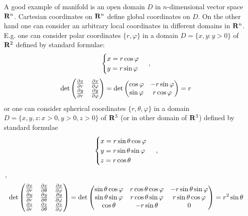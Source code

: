 \documentclass[12pt]{article}
\theoremstyle{theorem}
\numberwithin{equation}{section}
\begin{document}
    A good example of manifold is an open domain  $D$ in  
$n$-dimensional vector space ${\bf R}^n$.
    Cartesian coordinates on ${\bf R}^n$ define global coordinates on $D$.
    On the other hand one can consider an arbitrary 
local coordinates in different domains in ${\bf R}^n$. E.g. 
one can consider polar coordinates $\{r,\varphi\}$ 
in a domain $D=\{x,y\colon y>0\}$ of ${\bf R}^2$
    defined by standard formulae:
              \begin{equation}\label{exampleofpolarcoordinates}
                \begin{cases}
                x=r\cos\varphi\cr y=r\sin\varphi\cr
                \end{cases}\,,
              \end{equation}
            \begin{equation}\label{jacobianofpolartransform}
                \det
          \begin{pmatrix}
          {\partial x\over \partial r} &{\partial x\over \partial \varphi}\cr
          {\partial y\over \partial r} &{\partial y\over \partial \varphi}\cr
          \end{pmatrix}=
                \det
          \begin{pmatrix}
          \cos\varphi &-r\sin\varphi\cr
          \sin\varphi &r\cos\varphi\cr
          \end{pmatrix}=r
            \end{equation}
             or one can consider spherical 
coordinates  $\{r,\theta,\varphi\}$ in a domain
  $D=\{x,y,z\colon x>0,y>0, z>0\}$ of ${\bf R}^3$ (or in other domain of ${\bf R}^3$)
  defined by standard formulae
  \begin{equation*}
                \begin{cases}
                x=r\sin\theta\cos\varphi\cr 
            y=r\sin\theta\sin\varphi\cr z=r\cos\theta
                \end{cases}\,,
              \end{equation*}\,,
            \begin{equation}\label{jacobianofspherictransform}
                \det
          \begin{pmatrix}
          {\partial x\over \partial r} &{\partial x\over \partial \theta} &{\partial x\over \partial \varphi}\cr
          {\partial y\over \partial r} &{\partial y\over \partial \theta} &{\partial y\over \partial \varphi}\cr
           {\partial z\over \partial r} &{\partial z\over \partial \theta} &{\partial z\over \partial \varphi}\cr
          \end{pmatrix}=
                \det
          \begin{pmatrix}
          \sin\theta\cos\varphi &r\cos\theta\cos\varphi &-r\sin\theta\sin\varphi\cr
          \sin\theta\sin\varphi &r\cos\theta\sin\varphi &r\sin\theta\cos\varphi\cr
           \cos\theta &-r\sin\theta &0\cr
                 \end{pmatrix}=r^2\sin\theta
            \end{equation}
\end{document}
